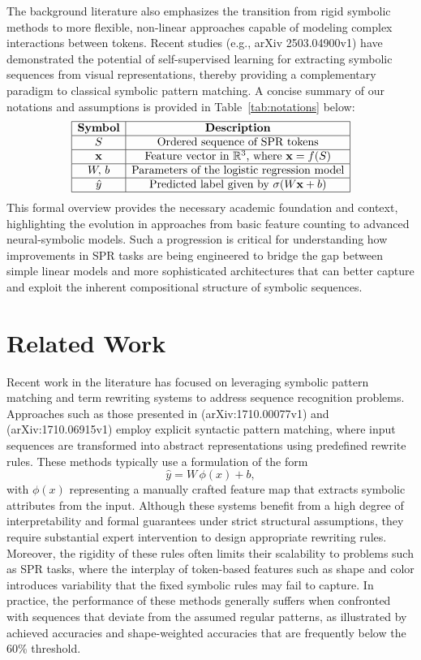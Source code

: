\documentclass{article}
\begin{document}
The background literature also emphasizes the transition from rigid symbolic methods to more flexible, non-linear approaches capable of modeling complex interactions between tokens. Recent studies (e.g., arXiv 2503.04900v1) have demonstrated the potential of self-supervised learning for extracting symbolic sequences from visual representations, thereby providing a complementary paradigm to classical symbolic pattern matching. A concise summary of our notations and assumptions is provided in Table~\ref{tab:notations} below:
\[
\begin{array}{|c|c|}
\hline
\textbf{Symbol} & \textbf{Description} \\
\hline
S & \text{Ordered sequence of SPR tokens} \\
\hline
\mathbf{x} & \text{Feature vector in } \mathbb{R}^3 \text{, where } \mathbf{x} = f(S) \\
\hline
W, \, b & \text{Parameters of the logistic regression model} \\
\hline
\hat{y} & \text{Predicted label given by } \sigma(W\mathbf{x} + b) \\
\hline
\end{array}
\]
This formal overview provides the necessary academic foundation and context, highlighting the evolution in approaches from basic feature counting to advanced neural-symbolic models. Such a progression is critical for understanding how improvements in SPR tasks are being engineered to bridge the gap between simple linear models and more sophisticated architectures that can better capture and exploit the inherent compositional structure of symbolic sequences.

\section{Related Work}
Recent work in the literature has focused on leveraging symbolic pattern matching and term rewriting systems to address sequence recognition problems. Approaches such as those presented in (arXiv:1710.00077v1) and (arXiv:1710.06915v1) employ explicit syntactic pattern matching, where input sequences are transformed into abstract representations using predefined rewrite rules. These methods typically use a formulation of the form 
\[
\hat{y} = W \, \phi(x) + b,
\]
with \(\phi(x)\) representing a manually crafted feature map that extracts symbolic attributes from the input. Although these systems benefit from a high degree of interpretability and formal guarantees under strict structural assumptions, they require substantial expert intervention to design appropriate rewriting rules. Moreover, the rigidity of these rules often limits their scalability to problems such as SPR tasks, where the interplay of token-based features such as shape and color introduces variability that the fixed symbolic rules may fail to capture. In practice, the performance of these methods generally suffers when confronted with sequences that deviate from the assumed regular patterns, as illustrated by achieved accuracies and shape-weighted accuracies that are frequently below the 60\% threshold.
\end{document}
